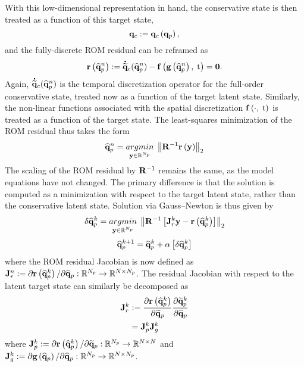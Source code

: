 With this low-dimensional representation in hand, the conservative state is then treated as a function of this target state,
%
\begin{equation}\label{eq:consFuncTarget}
    \mathbf{q}_{c} := \mathbf{q}_{c} \left(\mathbf{q}_{p}\right),
\end{equation}
%
and the fully-discrete ROM residual can be reframed as
%
\begin{equation}
    \mathbf{r}\left(\mathbf{\widehat{q}}_{p}^{n}\right) := \accentset{\mbox{\large\bfseries .}}{\mathbf{\widetilde{q}}}_{c}(\mathbf{\widehat{q}}_{p}^{n}) - \mathbf{f} \left(\mathbf{g} \left(\mathbf{\widehat{q}}_{p}^{n}\right), \; \text{t}\right) = \mathbf{0}.
\end{equation}
%
Again, $\accentset{\mbox{\large\bfseries .}}{\mathbf{\widetilde{q}}}_{c}(\mathbf{\widehat{q}}_{p}^{n})$ is the temporal discretization operator for the full-order conservative state, treated now as a function of the target latent state. Similarly, the non-linear functions associated with the spatial discretization $ \mathbf{f} \left(\cdot, \; \text{t}\right)$ is treated as a function of the target state. The least-squares minimization of the ROM residual thus takes the form
%
\begin{equation}\label{eq:mplsvtLS}
    \primVecCoef^{\timeIdx} = \argmin{\dummyVec \inROne{\numPrimModes}} \left\Vert \resScaleInv \resFunc{\dummyVec} \right\Vert_2
\end{equation}
%
The scaling of the ROM residual by $\resScaleInv$ remains the same, as the model equations have not changed. The primary difference is that the solution is computed as a minimization with respect to the target latent state, rather than the conservative latent state. Solution via Gauss--Newton is thus given by
%
\begin{equation}\label{eq:mplsvtLSLin}
    \delta \primVecCoef^{\newtonIdx} = \argmin{\dummyVec \inROne{\numPrimModes}} \left\Vert \resScaleInv \left[\jacobRes^{\newtonIdx} \dummyVec - \resFunc{\primVecCoef^{\newtonIdx}}\right] \right\Vert_2
\end{equation}
\begin{equation}
    \mathbf{\widehat{q}}_{p}^{k + 1} = \mathbf{\widehat{q}}_{p}^{k} + \alpha \left[ \delta \mathbf{\widehat{q}}_{p}^{k} \right]
\end{equation}
%
where the ROM residual Jacobian is now defined as $\mathbf{J}_{r}^{n} := \partial \mathbf{r}\left(\mathbf{\widehat{q}}_{p}^{k}\right) / \partial \mathbf{\widehat{q}}_{p}: \mathbb{R}^{N_p} \rightarrow \mathbb{R}^{N \times N_p}$. The residual Jacobian with respect to the latent target state can similarly be decomposed as
%
\begin{align}
    \mathbf{J}_{r}^{k} &:= \frac{\partial \mathbf{r}\left(\mathbf{\widehat{q}}_{p}^{k}\right)}{\partial \mathbf{\widetilde{q}}_{p}} \frac{\partial \mathbf{\widetilde{q}}_{p}^{k}}{\partial \mathbf{\widehat{q}}_{p}} \\
    &= \mathbf{J}_{p}^{k} \mathbf{J}_{g}^{k}
\end{align}
%
where $\mathbf{J}_{p}^{k} := \partial \mathbf{r}\left(\mathbf{\widehat{q}}_{p}^{k}\right) / \partial \mathbf{\widetilde{q}}_{p}: \mathbb{R}^{N_p} \rightarrow \mathbb{R}^{N \times N}$ and $\mathbf{J}_{g}^{k} := \partial \mathbf{g} \left(\mathbf{\widehat{q}}_{p}\right) / \partial \mathbf{\widehat{q}}_{p}: \mathbb{R}^{N_p} \rightarrow \mathbb{R}^{N \times N_p}$.

